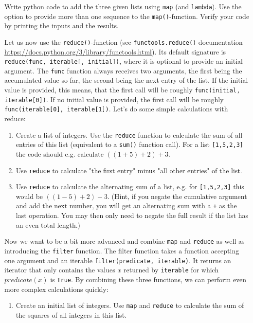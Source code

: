 \documentclass[]{erlangen-problemset}
\begin{document}
\begin{problem}[title={Working with advanced data processing functions}]
\begin{enumerate}
	Write python code to add the three given lists using \texttt{map} (and \texttt{lambda}). 
	Use the option to provide more than one sequence to the \texttt{map()}-function. 
	Verify your code by printing the inputs and the results.
\end{enumerate}
\Question Let us now use the \texttt{reduce()}-function (see \texttt{functools.reduce()} documentation \url{https://docs.python.org/3/library/functools.html}). 
Its default signature is \texttt{reduce(func, iterable[, initial])}, where it is optional to provide an initial argument. 
The \texttt{func} function always receives two arguments, the first being the accumulated value so far, the second being the next entry of the list. 
If the initial value is provided, this means, that the first call will be roughly \texttt{func(initial, iterable[0])}. 
If no initial value is provided, the first call will be roughly \texttt{func(iterable[0], iterable[1])}. 
Let's do some simple calculations with reduce:
\begin{enumerate}
	\item Create a list of integers. Use the \texttt{reduce} function to calculate the sum of all entries of this list (equivalent to a \texttt{sum()} function call). For a list \texttt{[1,5,2,3]} the code should e.g. calculate $((1+5)+2)+3$.
	\item Use \texttt{reduce} to calculate "the first entry" minus "all other entries" of the list. 
	\item Use \texttt{reduce} to calculate the alternating sum of a list, e.g. for \texttt{[1,5,2,3]} this would be $((1-5)+2)-3$. 
	(Hint, if you negate the cumulative argument and add the next number, you will get an alternating sum with a \texttt{+} as the last operation. 
	You may then only need to negate the full result if the list has an even total length.)
\end{enumerate}
\Question Now we want to be a bit more advanced and combine \texttt{map} and \texttt{reduce} as well as introducing the \texttt{filter} function. 
The filter function takes a function accepting one argument and an iterable \texttt{filter(predicate, iterable)}. 
It returns an iterator that only contains the values $x$ returned by \texttt{iterable} for which $predicate(x)$ is \texttt{True}. 
By combining these three functions, we can perform even more complex calculations quickly:
\begin{enumerate}
	\item Create an initial list of integers. 
	Use \texttt{map} and \texttt{reduce} to calculate the sum of the squares of all integers in this list. 

\end{enumerate}
\end{problem}
\end{document}
